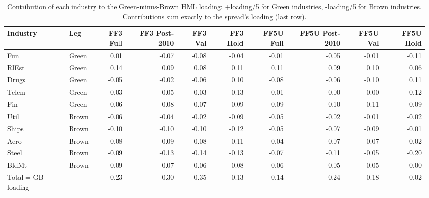 \begin{table}[H]
\centering\small
\caption{Contribution of each industry to the Green-minus-Brown HML loading: +loading/5 for Green industries, -loading/5 for Brown industries. Contributions sum exactly to the spread's loading (last row).}
\label{tab:m2_hml_contrib}
\begin{adjustbox}{max width=\linewidth}
\begin{tabular}{llrrrrrrrr}
\toprule
Industry & Leg & FF3 Full & FF3 Post-2010 & FF3 Val & FF3 Hold & FF5U Full & FF5U Post-2010 & FF5U Val & FF5U Hold \\
\midrule
Fun & Green & 0.01 & -0.07 & -0.08 & -0.04 & -0.01 & -0.05 & -0.01 & -0.11 \\
RlEst & Green & 0.14 & 0.09 & 0.08 & 0.11 & 0.11 & 0.09 & 0.10 & 0.06 \\
Drugs & Green & -0.05 & -0.02 & -0.06 & 0.10 & -0.08 & -0.06 & -0.10 & 0.11 \\
Telcm & Green & 0.03 & 0.05 & 0.03 & 0.13 & 0.01 & 0.00 & 0.00 & 0.12 \\
Fin & Green & 0.06 & 0.08 & 0.07 & 0.09 & 0.09 & 0.10 & 0.11 & 0.09 \\
Util & Brown & -0.06 & -0.04 & -0.02 & -0.09 & -0.05 & -0.02 & -0.01 & -0.02 \\
Ships & Brown & -0.10 & -0.10 & -0.10 & -0.12 & -0.05 & -0.07 & -0.09 & -0.01 \\
Aero & Brown & -0.08 & -0.09 & -0.08 & -0.11 & -0.04 & -0.07 & -0.07 & -0.02 \\
Steel & Brown & -0.09 & -0.13 & -0.14 & -0.13 & -0.07 & -0.11 & -0.05 & -0.20 \\
BldMt & Brown & -0.09 & -0.07 & -0.06 & -0.08 & -0.06 & -0.05 & -0.05 & 0.00 \\
Total = GB loading &  & -0.23 & -0.30 & -0.35 & -0.13 & -0.14 & -0.24 & -0.18 & 0.02 \\
\bottomrule
\end{tabular}
\end{adjustbox}
\end{table}
